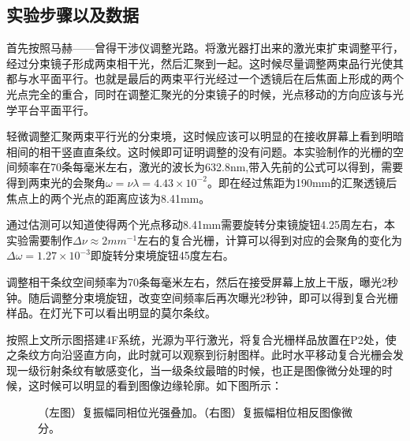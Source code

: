 \documentclass[aps,pre,12pt,preprint,onecolumn,showpacs,showkeys,UTF8]{revtex4-1}
\begin{document}
\subsection{实验步骤以及数据}

首先按照马赫——曾得干涉仪调整光路。将激光器打出来的激光束扩束调整平行，经过分束镜子形成两束相干光，然后汇聚到一起。这时候尽量调整两束品行光使其都与水平面平行。也就是最后的两束平行光经过一个透镜后在后焦面上形成的两个光点完全的重合，同时在调整汇聚光的分束镜子的时候，光点移动的方向应该与光学平台平面平行。

轻微调整汇聚两束平行光的分束境，这时候应该可以明显的在接收屏幕上看到明暗相间的相干竖直直条纹。这时候即可证明调整的没有问题。本实验制作的光栅的空间频率在70条每毫米左右，激光的波长为632.8nm,带入先前的公式可以得到，需要得到两束光的会聚角$\omega=\nu\lambda=4.43\times10^{-2}$。即在经过焦距为190mm的汇聚透镜后焦点上的两个光点的距离应该为8.41mm。

通过估测可以知道使得两个光点移动8.41mm需要旋转分束镜旋钮4.25周左右，本实验需要制作$\Delta\nu\approx2 mm^{-1}$左右的复合光栅，计算可以得到对应的会聚角的变化为$\Delta\omega=1.27\times10^{-3}$即旋转分束境旋钮45度左右。

调整相干条纹空间频率为70条每毫米左右，然后在接受屏幕上放上干版，曝光2秒钟。随后调整分束境旋钮，改变空间频率后再次曝光2秒钟，即可以得到复合光栅样品。在灯光下可以看出明显的莫尔条纹。

按照上文所示图搭建4F系统，光源为平行激光，将复合光栅样品放置在P2处，使之条纹方向沿竖直方向，此时就可以观察到衍射图样。此时水平移动复合光栅会发现一级衍射条纹有敏感变化，当一级条纹最暗的时候，也正是图像微分处理的时候，这时候可以明显的看到图像边缘轮廓。如下图所示：
\newpage
\begin{figure}[h]
	\begin{center}
		\caption{\label{fig:exp2}（左图）复振幅同相位光强叠加。（右图）复振幅相位相反图像微分。}
	\end{center}
\end{figure}
\end{document}

